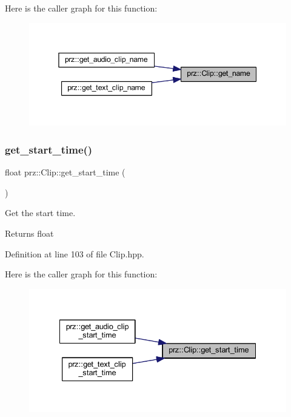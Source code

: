 Here is the caller graph for this function\+:
\nopagebreak
\begin{figure}[H]
\begin{center}
\leavevmode
\includegraphics[width=345pt]{classprz_1_1_clip_accaf42d7a82d41ad70032870981f8d83_icgraph}
\end{center}
\end{figure}
\mbox{\label{classprz_1_1_clip_a65df9388088c8a607e90b73506550cd5}} 
\subsubsection{\texorpdfstring{get\_start\_time()}{get\_start\_time()}}
{\footnotesize\ttfamily float prz\+::\+Clip\+::get\+\_\+start\+\_\+time (\begin{DoxyParamCaption}{ }\end{DoxyParamCaption})\hspace{0.3cm}{\ttfamily [inline]}}



Get the start time. 

\begin{DoxyReturn}{Returns}
float 
\end{DoxyReturn}


Definition at line 103 of file Clip.\+hpp.

Here is the caller graph for this function\+:
\nopagebreak
\begin{figure}[H]
\begin{center}
\leavevmode
\includegraphics[width=335pt]{classprz_1_1_clip_a65df9388088c8a607e90b73506550cd5_icgraph}
\end{center}
\end{figure}
\mbox{\label{classprz_1_1_clip_a2b970808e50b0003a638c78ba6d26200}} 
